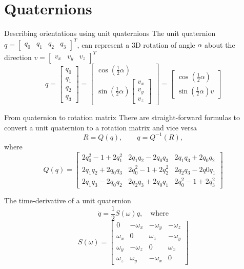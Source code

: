 \documentclass[presentation,aspectratio=169]{beamer}
\begin{document}
\section{Quaternions}
\label{sec-3}
\begin{frame}[label=sec-3-1]{Describing orientations using unit quaternions}
The unit quaternion $q= \begin{bmatrix}q_0& q_1 & q_2 & q_3 \end{bmatrix}^T$, can represent a 3D rotation of angle $\alpha$ about the direction $v=\begin{bmatrix}v_x & v_y & v_z\end{bmatrix}^T$
\begin{equation*}
q = \begin{bmatrix}q_0\\ q_1 \\ q_2 \\ q_3 \end{bmatrix}
  = \begin{bmatrix} \cos(\frac{1}{2}\alpha)\\ \sin(\frac{1}{2}\alpha) \begin{bmatrix} v_x\\v_y\\v_z\end{bmatrix} \end{bmatrix} = \begin{bmatrix} \cos(\frac{1}{2}\alpha)\\\sin(\frac{1}{2}\alpha) v \end{bmatrix}
\end{equation*}
\end{frame}
\begin{frame}[label=sec-3-2]{From quaternion to rotation matrix}
There are straight-forward formulas to convert a unit quaternion to a rotation matrix and vice versa
\[R = Q(q), \qquad q = Q^{-1}(R),\]
where 
\[Q(q) = \begin{bmatrix} 2q_0^2-1+2q_1^2 & 2q_1q_2-2q_0q_3 & 2q_1q_3 + 2q_0q_2\\
   2q_1q_2 + 2q_0q_3 & 2q_0^2-1+2q_2^2 &2q_2q_3-2q0q_1\\
   2q_1q_3-2q_0q_2 & 2q_2q_3+2q_0q_1 &2q_0^2-1+2q_3^2 \end{bmatrix} \]
\end{frame}
\begin{frame}[label=sec-3-3]{The time-derivative of a unit quaternion}
\[ \dot{q} = \frac{1}{2}S(\omega) q, \quad \text{where} \]
\[ S(\omega) = \begin{bmatrix} 0 & -\omega_x & -\omega_y & -\omega_z\\
   \omega_x & 0 & \omega_z & -\omega_y\\
   \omega_y & -\omega_z & 0 & \omega_x\\
   \omega_z & \omega_y & -\omega_x & 0 \end{bmatrix} \]
\end{frame}
\end{document}
